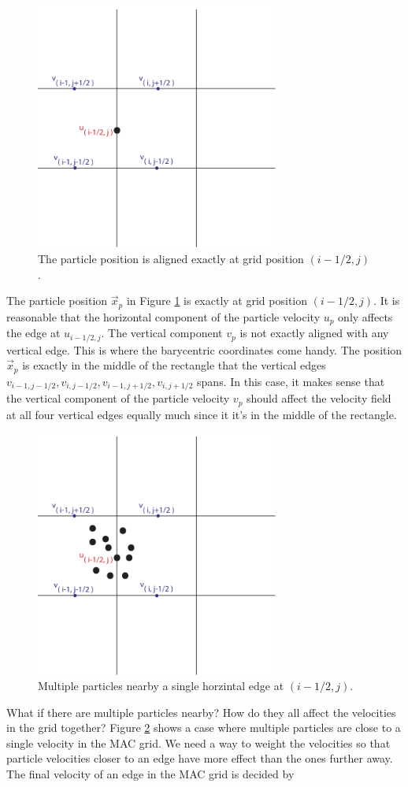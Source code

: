 \begin{figure}[ht!]
\centering
\includegraphics[width=80mm]{img/transfer1.pdf}
\caption{The particle position is aligned exactly at grid position $(i-1/2,j)$.}
\label{onedge}
\end{figure}
\noindent
The particle position $\vec{x}_p$ in Figure \ref{onedge} is exactly at grid position $(i-1/2,j)$. It is reasonable that the horizontal component of the particle velocity $u_p$ only affects the edge at $u_{i-1/2,j}$. The vertical component $v_p$ is not exactly aligned with any vertical edge. This is where the barycentric coordinates come handy. The position $\vec{x}_p$ is exactly in the middle of the rectangle that the vertical edges $v_{i-1,j-1/2}, v_{i,j-1/2}, v_{i-1,j+1/2}, v_{i,j+1/2} $ spans. In this case, it makes sense that the vertical component of the particle velocity $v_p$ should affect the velocity field at all four vertical edges equally much since it it's in the middle of the rectangle.
\begin{figure}[ht!]
\centering
\includegraphics[width=80mm]{img/transfer2.pdf}
\caption{Multiple particles nearby a single horzintal edge at $(i-1/2,j)$.}
\label{fouredge}
\end{figure}
\newline
\newline
\noindent
What if there are multiple particles nearby? How do they all affect the velocities in the grid together? Figure \ref{fouredge} shows a case where multiple particles are close to a single velocity in the MAC grid. We need a way to weight the velocities so that particle velocities closer to an edge have more effect than the ones further away. The final velocity of an edge in the MAC grid is decided by

